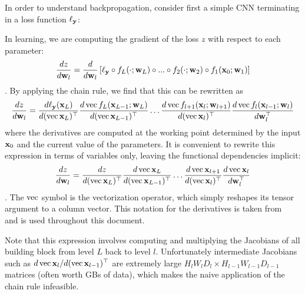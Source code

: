 In order to understand backpropagation, consider first a simple CNN terminating in a loss function $\ell_{\mathbf{y}}$:
\begin{center}
\end{center}
In learning, we are computing the gradient of the loss $z$ with respect to each parameter:
\[
\frac{dz}{d\mathbf{w}_l} = 
\frac{d}{d\mathbf{w}_l}
\left[\ell_{\mathbf{y}} \circ f_L(\cdot;\mathbf{w}_L) \circ ... \circ 
f_2(\cdot;\mathbf{w}_2) \circ f_1(\mathbf{x}_0;\mathbf{w}_1)\right]
\].
By applying the chain rule, we find that this can be rewritten as
\[\label{e:chain-rule}
\frac{dz}{d\mathbf{w}_l} 
= 
\frac{d\ell_{\mathbf{y}}(\mathbf{x}_{L})}{d(\operatorname{vec}\mathbf{x}_{L})^\top}
\frac{d\operatorname{vec} f_L(\mathbf{x}_{L-1};\mathbf{w}_{L})}{d(\operatorname{vec}\mathbf{x}_{L-1})^\top}
\dots
\frac{d\operatorname{vec} f_{l+1}(\mathbf{x}_{l};\mathbf{w}_{l+1})}{d(\operatorname{vec}\mathbf{x}_{l})^\top}
\frac{d\operatorname{vec} f_l(\mathbf{x}_{l-1};\mathbf{w}_{l})}{d\mathbf{w}_l^\top}
\]
where the derivatives are computed at the working point determined by the input $\mathbf{x}_0$ and the current value of the parameters. It is convenient to rewrite this expression in terms of variables only, leaving the functional dependencies implicit:
\[\label{e:chain-rule}
\frac{dz}{d\mathbf{w}_l} 
= 
\frac{dz}{d(\operatorname{vec}\mathbf{x}_{L})^\top}
\frac{d\operatorname{vec}\mathbf{x}_{L}}{d(\operatorname{vec}\mathbf{x}_{L-1})^\top}
\dots
\frac{d\operatorname{vec}\mathbf{x}_{l+1}}{d(\operatorname{vec}\mathbf{x}_{l})^\top}
\frac{d\operatorname{vec}\mathbf{x}_{l}}{d\mathbf{w}_l^\top}
\].
The $\operatorname{vec}$ symbol is the vectorization operator, which simply reshapes its tensor argument to a column vector. This notation for the derivatives is taken from~\cite{kinghorn96integrals} and is used throughout this document.

Note that this expression involves computing and multiplying the Jacobians of all building block from level $L$ back to level $l$.  Unfortunately intermediate Jacobians such as $d\operatorname{vec} \mathbf{x}_l / d(\operatorname{vec} \mathbf{x}_{l-1})^\top$ are extremely large $H_l W_l D_l  \times H_{l-1} W_{l-1} D_{l-1}$ matrices (often worth GBs of data), which makes the naive application of the chain rule infeasible.

